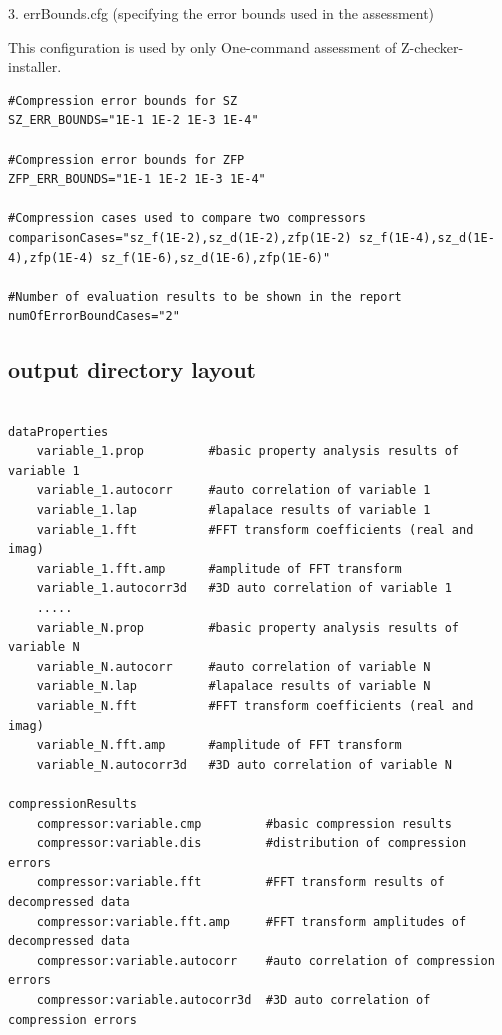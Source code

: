 3. errBounds.cfg (specifying the error bounds used in the assessment)

This configuration is used by only One-command assessment of Z-checker-installer.
\begin{lstlisting}[style=ShellStyleInline, basicstyle =\footnotesize\ttfamily]
#Compression error bounds for SZ
SZ_ERR_BOUNDS="1E-1 1E-2 1E-3 1E-4"

#Compression error bounds for ZFP
ZFP_ERR_BOUNDS="1E-1 1E-2 1E-3 1E-4"

#Compression cases used to compare two compressors
comparisonCases="sz_f(1E-2),sz_d(1E-2),zfp(1E-2) sz_f(1E-4),sz_d(1E-4),zfp(1E-4) sz_f(1E-6),sz_d(1E-6),zfp(1E-6)"

#Number of evaluation results to be shown in the report
numOfErrorBoundCases="2"
\end{lstlisting}

\subsection{output directory layout}

\begin{lstlisting}[style=ShellStyleInline, basicstyle =\footnotesize\ttfamily]

dataProperties
    variable_1.prop         #basic property analysis results of variable 1
    variable_1.autocorr     #auto correlation of variable 1
    variable_1.lap          #lapalace results of variable 1
    variable_1.fft          #FFT transform coefficients (real and imag)
    variable_1.fft.amp      #amplitude of FFT transform
    variable_1.autocorr3d   #3D auto correlation of variable 1
    .....
    variable_N.prop         #basic property analysis results of variable N
    variable_N.autocorr     #auto correlation of variable N
    variable_N.lap          #lapalace results of variable N
    variable_N.fft          #FFT transform coefficients (real and imag)
    variable_N.fft.amp      #amplitude of FFT transform 
    variable_N.autocorr3d   #3D auto correlation of variable N
    
compressionResults
    compressor:variable.cmp         #basic compression results
    compressor:variable.dis         #distribution of compression errors
    compressor:variable.fft         #FFT transform results of decompressed data
    compressor:variable.fft.amp     #FFT transform amplitudes of decompressed data
    compressor:variable.autocorr    #auto correlation of compression errors
    compressor:variable.autocorr3d  #3D auto correlation of compression errors
\end{lstlisting}

